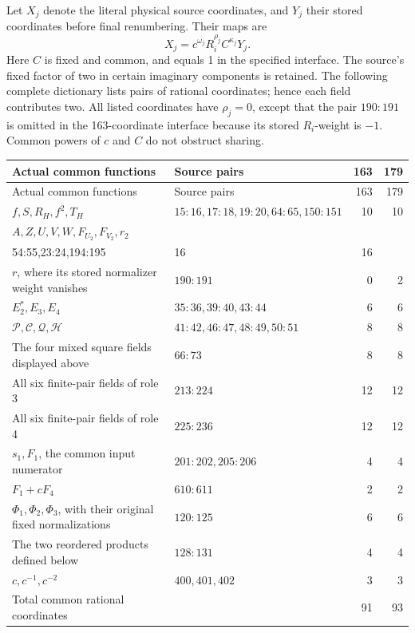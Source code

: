 \documentclass[11pt]{article}
\begin{document}
Let \(X_j\) denote the literal physical source coordinates, and
\(Y_j\) their stored coordinates before final renumbering. Their maps
are
\begin{equation}\label{eq:global-stored-map}
                 X_j=c^{\omega_j}R_i^{\rho_j}C^{\kappa_j}Y_j.
\end{equation}
Here \(C\) is fixed and common, and equals 1 in the specified interface.
The source's fixed factor of two in certain imaginary components is
retained. The following complete dictionary lists pairs of rational
coordinates; hence each field contributes two. All listed coordinates
have \(\rho_j=0\), except that the pair \(190:191\) is omitted in
the 163-coordinate interface because its stored \(R_i\)-weight is
\(-1\). Common powers of \(c\) and \(C\) do not obstruct sharing.

\begin{center}\small
\begin{longtable}{@{}p{67mm}p{58mm}r r@{}}
\toprule
Actual common functions & Source pairs & 163 & 179\\
\midrule\endfirsthead
\toprule
Actual common functions & Source pairs & 163 & 179\\
\midrule\endhead
\(f,S,R_H,f^2,T_H\) & \(15:16,17:18,19:20,64:65,150:151\) &10&10\\
\(A,Z,U,V,W,F_{U_2},F_{V_2},r_2\) &
\(\begin{gathered}33:34,102:103,182:187,\\54:55,23:24,194:195\end{gathered}\)&16&16\\
\(r\), where its stored normalizer weight vanishes & \(190:191\)&0&2\\
\(E_2^*,E_3,E_4\)&\(35:36,39:40,43:44\)&6&6\\
\(\mathcal P,\mathcal C,\mathcal Q,\mathcal H\)&\(41:42,46:47,48:49,50:51\)&8&8\\
The four mixed square fields displayed above & \(66:73\)&8&8\\
All six finite-pair fields of role 3 & \(213:224\)&12&12\\
All six finite-pair fields of role 4 & \(225:236\)&12&12\\
\(s_1,F_1\), the common input numerator &\(201:202,205:206\)&4&4\\
\(F_1+cF_4\)&\(610:611\)&2&2\\
\(\Phi_1,\Phi_2,\Phi_3\), with their original fixed normalizations
&\(120:125\)&6&6\\
The two reordered products defined below &\(128:131\)&4&4\\
\(c,c^{-1},c^{-2}\)&\(400,401,402\)&3&3\\
\midrule
Total common rational coordinates&&91&93\\
\bottomrule
\end{longtable}
\end{center}
\end{document}
